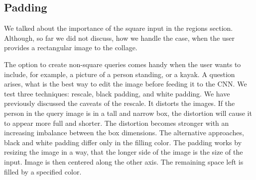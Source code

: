 \subsection{Padding}

We talked about the importance of the square input in the regions section. Although, so far we did not discuss, how we handle the case, when the user provides a rectangular image to the collage.

The option to create non-square queries comes handy when the user wants to include, for example, a picture of a person standing, or a kayak. A question arises, what is the best way to edit the image before feeding it to the CNN. We test three techniques: rescale, black padding, and white padding. We have previously discussed the caveats of the rescale. It distorts the images. If the person in the query image is in a tall and narrow box, the distortion will cause it to appear more full and shorter. The distortion becomes stronger with an increasing imbalance between the box dimensions. The alternative approaches, black and white padding differ only in the filling color. The padding works by resizing the image in a way, that the longer side of the image is the size of the input. Image is then centered along the other axis. The remaining space left is filled by a specified color.






